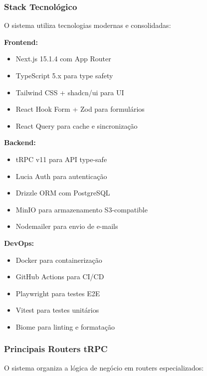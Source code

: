 \documentclass[portuguese]{sbc2025}%
\begin{document}
\subsubsection{Stack Tecnológico}

O sistema utiliza tecnologias modernas e consolidadas:

\textbf{Frontend:}
\begin{itemize}
  \item Next.js 15.1.4 com App Router
  \item TypeScript 5.x para type safety
  \item Tailwind CSS + shadcn/ui para UI
  \item React Hook Form + Zod para formulários
  \item React Query para cache e sincronização
\end{itemize}

\textbf{Backend:}
\begin{itemize}
  \item tRPC v11 para API type-safe
  \item Lucia Auth para autenticação
  \item Drizzle ORM com PostgreSQL
  \item MinIO para armazenamento S3-compatible
  \item Nodemailer para envio de e-mails
\end{itemize}

\textbf{DevOps:}
\begin{itemize}
  \item Docker para containerização
  \item GitHub Actions para CI/CD
  \item Playwright para testes E2E
  \item Vitest para testes unitários
  \item Biome para linting e formatação
\end{itemize}

\subsubsection{Principais Routers tRPC}

O sistema organiza a lógica de negócio em routers especializados:
\end{document}
